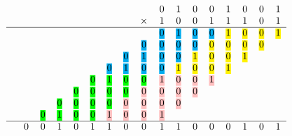 \documentclass[11pt]{article}
\newcommand{\hlc}[2][yellow]{{%
    \colorlet{foo}{#1}%
    \sethlcolor{foo}\hl{#2}}%
}
\begin{document}
\begin{equation}
    \label{eq:16bit}
    \begin{tabular}{c c c c c c c c c c c c c c c c c c}
        &   &   &   &   &  &  &  &   & 0 & 1 & 0 & 0 & 1 & 0 & 0 & 1\\
        &   &   &   & &&&&$\times$   & 1 & 0 & 0 & 1 & 1 & 1 & 0 & 1 \\
                \hline
        &   &   &   &   &   &   &   &   & \hlc[cyan]{0} & \hlc[cyan]{1} & \hlc[cyan]{0} & \hlc[cyan]{0} & \hlc[yellow]{1} & \hlc[yellow]{0} & \hlc[yellow]{0} & \hlc[yellow]{1} \\
        &   &   &   &   &   &   &   & \hlc[cyan]{0} & \hlc[cyan]{0} & \hlc[cyan]{0} & \hlc[cyan]{0} & \hlc[yellow]{0} & \hlc[yellow]{0} & \hlc[yellow]{0} & \hlc[yellow]{0} &   \\
        &   &   &   &   &   &   & \hlc[cyan]{0} & \hlc[cyan]{1} & \hlc[cyan]{0} & \hlc[cyan]{0} & \hlc[yellow]{1} & \hlc[yellow]{0} & \hlc[yellow]{0} & \hlc[yellow]{1} &   &   \\
        &   &   &   &   &   & \hlc[cyan]{0} & \hlc[cyan]{1} & \hlc[cyan]{0} & \hlc[cyan]{0} & \hlc[yellow]{1} & \hlc[yellow]{0} & \hlc[yellow]{0} & \hlc[yellow]{1} &   &   &   \\
        &   &   &   &   & \hlc[green]{0} & \hlc[green]{1} & \hlc[green]{0} & \hlc[green]{0} & \hlc[pink]{1} & \hlc[pink]{0} & \hlc[pink]{0} & \hlc[pink]{1} &   &   &   &   \\
        &   &   &   & \hlc[green]{0} & \hlc[green]{0} & \hlc[green]{0} & \hlc[green]{0} & \hlc[pink]{0} & \hlc[pink]{0} & \hlc[pink]{0} & \hlc[pink]{0} &   &   &   &   &   \\
        &   &   & \hlc[green]{0} & \hlc[green]{0} & \hlc[green]{0} & \hlc[green]{0} & \hlc[pink]{0} & \hlc[pink]{0} & \hlc[pink]{0} & \hlc[pink]{0} &   &   &   &   &   &   \\
        &   & \hlc[green]{0} & \hlc[green]{1} & \hlc[green]{0} & \hlc[green]{0} & \hlc[pink]{1} & \hlc[pink]{0} & \hlc[pink]{0} & \hlc[pink]{1} &   &   &   &   &   &   &   \\
                \hline
        & 0 & 0 & 1 & 0 & 1 & 1 & 0 & 0 & 1 & 1 & 0 & 0 & 0 & 1 & 0 & 1 \\
    \end{tabular} 
\end{equation}
\end{document}
